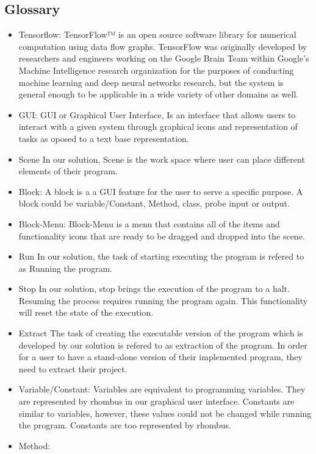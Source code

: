 \documentclass[a4paper,10pt]{article} \usepackage[margin=1.0in]{geometry} \usepackage{pdfpages} \usepackage{graphicx}
\begin{document}
\subsection{Glossary}
\begin{itemize}
	\item Tensorflow:
		TensorFlow™ is an open source software library for numerical computation using data flow graphs.
		TensorFlow was originally developed by researchers and engineers working on the Google Brain Team within
		Google's Machine Intelligence research organization for the purposes of conducting machine learning and 
		deep neural networks research, but the system is general enough to be applicable in a wide variety of other domains as well.
	\item GUI:
		GUI or Graphical User Interface, Is an interface that allows users to interact with a given system through graphical icons and representation of tasks as oposed to a text base representation.
	\item Scene
		In our solution, Scene is the work space where user can place different elements of their program.
	\item Block:
		A block is a a GUI feature for the user to serve a specific purpose. A block could be variable/Constant, Method, class, probe input or output.
	\item Block-Menu:
		Block-Menu is a menu that contains all of the items and functionality icons that are ready to be dragged and dropped into the scene.
	\item Run
		In our solution, the task of starting executing the program is refered to as Running the program.
	\item Stop
		In our solution, stop brings the execution of the program to a halt. Resuming the process requires running the program again.
		This functionality will reset the state of the execution.
	\item Extract
		The task of creating the executable version of the program which is developed by our solution is refered to as extraction of the program.
		In order for a user to have a stand-alone version of their implemented program, they need to extract their project.
	\item Variable/Constant:
		Variables are equivalent to programming variables. They are represented by rhombus in our graphical user interface.
		Constants are similar to  variables, however, these values could not be changed while running the program.
		Constants are too represented by rhombus.
	\item Method:

\end{itemize}
\end{document}
